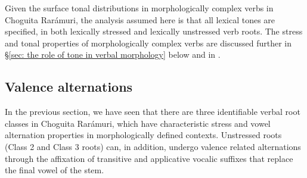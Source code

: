     \z

Given the surface tonal distributions in morphologically complex verbs in Choguita Rarámuri, the analysis assumed here is that all lexical tones are specified, in both lexically stressed and lexically unstressed verb roots. The stress and tonal properties of morphologically complex verbs are discussed further in §\ref{sec: the role of tone in verbal morphology} below and in .






\subsection{Valence alternations}
\label{subsec: valence alternations}

In the previous section, we have seen that there are three identifiable verbal root classes in Choguita Rarámuri, which have characteristic stress and vowel alternation properties in morphologically defined contexts. Unstressed roots (Class 2 and Class 3 roots) can, in addition, undergo valence related alternations through the affixation of transitive and applicative vocalic suffixes that replace the final vowel of the stem.

